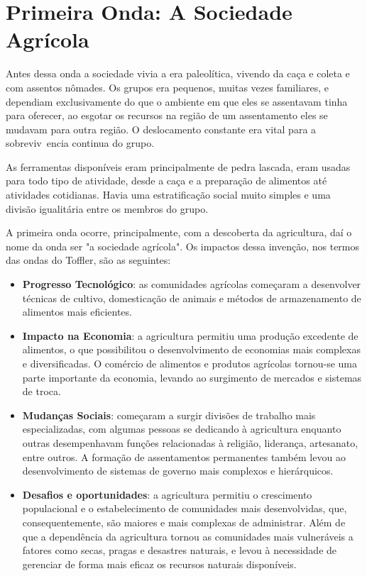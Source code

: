 \section{
    Primeira Onda: A Sociedade Agrícola
    }

\setlength{\parindent}{4em}
\setlength{\parskip}{0.5em}
\renewcommand{\baselinestretch}{1}

Antes dessa onda a sociedade vivia a era paleolítica, vivendo da caça e coleta e com assentos nômades. Os grupos era pequenos, muitas vezes familiares, e dependiam exclusivamente do que o ambiente em que eles se assentavam tinha para oferecer, ao esgotar os recursos na região de um assentamento eles se mudavam para outra região. O deslocamento constante era vital para a sobreviv~encia continua do grupo.

As ferramentas disponíveis eram principalmente de pedra lascada, eram usadas para todo tipo de atividade, desde a caça e a preparação de alimentos até atividades cotidianas. Havia uma estratificação social muito simples e uma divisão igualitária entre os membros do grupo.

A primeira onda ocorre, principalmente, com a descoberta da agricultura, daí o nome da onda ser "a sociedade agrícola". Os impactos dessa invenção, nos termos das ondas do Toffler, são as seguintes:

\begin{itemize}
	\item \textbf{Progresso Tecnológico}: as comunidades agrícolas começaram a desenvolver técnicas de cultivo, domesticação de animais e métodos de armazenamento de alimentos mais eficientes.
	\item \textbf{Impacto na Economia}: a agricultura permitiu uma produção excedente de alimentos, o que possibilitou o desenvolvimento de economias mais complexas e diversificadas. O comércio de alimentos e produtos agrícolas tornou-se uma parte importante da economia, levando ao surgimento de mercados e sistemas de troca.
	\item \textbf{Mudanças Sociais}: começaram a surgir divisões de trabalho mais especializadas, com algumas pessoas se dedicando à agricultura enquanto outras desempenhavam funções relacionadas à religião, liderança, artesanato, entre outros. A formação de assentamentos permanentes também levou ao desenvolvimento de sistemas de governo mais complexos e hierárquicos.
	\item \textbf{Desafios e oportunidades}: a agricultura permitiu o crescimento populacional e o estabelecimento de comunidades mais desenvolvidas, que, consequentemente, são maiores e mais complexas de administrar. Além de que a dependência da agricultura tornou as comunidades mais vulneráveis a fatores como secas, pragas e desastres naturais, e levou à necessidade de gerenciar de forma mais eficaz os recursos naturais disponíveis.
\end{itemize}

